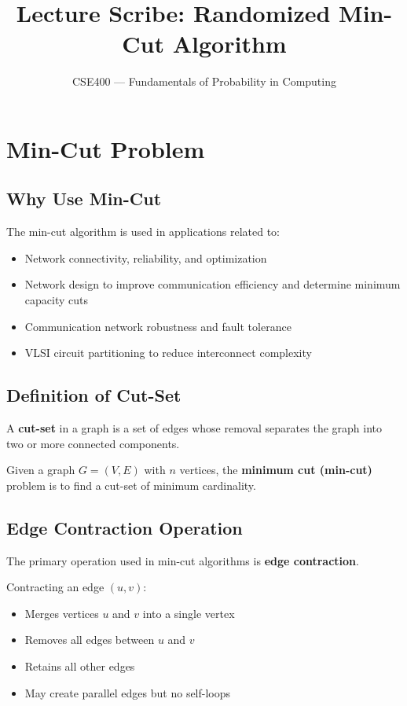 \documentclass[12pt]{article}
\title{\textbf{Lecture Scribe: Randomized Min-Cut Algorithm}}
\author{CSE400 --- Fundamentals of Probability in Computing}
\date{}
\begin{document}
\maketitle

\section{Min-Cut Problem}

\subsection{Why Use Min-Cut}
The min-cut algorithm is used in applications related to:
\begin{itemize}
    \item Network connectivity, reliability, and optimization
    \item Network design to improve communication efficiency and determine minimum capacity cuts
    \item Communication network robustness and fault tolerance
    \item VLSI circuit partitioning to reduce interconnect complexity
\end{itemize}

\subsection{Definition of Cut-Set}
A \textbf{cut-set} in a graph is a set of edges whose removal separates the graph into two or more connected components.

Given a graph $G=(V,E)$ with $n$ vertices, the \textbf{minimum cut (min-cut)} problem is to find a cut-set of minimum cardinality.

\subsection{Edge Contraction Operation}
The primary operation used in min-cut algorithms is \textbf{edge contraction}.

Contracting an edge $(u,v)$:
\begin{itemize}
    \item Merges vertices $u$ and $v$ into a single vertex
    \item Removes all edges between $u$ and $v$
    \item Retains all other edges
    \item May create parallel edges but no self-loops
\end{itemize}
\end{document}
